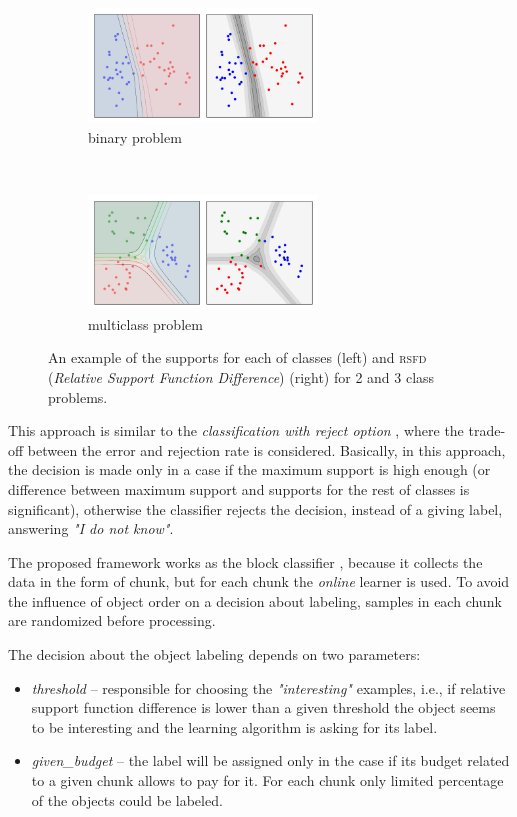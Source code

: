 \begin{figure}[!ht]
	\centering
	\begin{subfigure}[b]{0.5\textwidth}
        \centering
        \includegraphics[height=1.2in]{figures/2_classes}
        \caption{binary problem}
    \end{subfigure}%
    ~ 
    \begin{subfigure}[b]{0.5\textwidth}
        \centering
        \includegraphics[height=1.2in]{figures/3_classes}
        \caption{multiclass problem}
    \end{subfigure}
    
	\caption{An example of the supports for each of classes (left) and \textsc{rsfd} (\emph{Relative Support Function Difference}) (right) for 2 and 3 class problems.}
	\label{fig:gestosc}
\end{figure}

This approach is similar to the \emph{classification with reject option} \cite{Chow:1970,Fumera:2000}, where the trade-off between the error and rejection rate is considered. Basically, in this approach, the decision is made only in a case if the maximum support is high enough (or difference between maximum support and supports for the rest of classes is significant), otherwise the classifier rejects the decision, instead of a giving label, answering \emph{"I do not know"}.   

The proposed framework works as the block classifier \cite{Krawczyk:2017}, because it collects the data in the form of chunk, but for each chunk the \emph{online} learner is used. To avoid the influence of object order on a decision about labeling, samples in each chunk are randomized before processing.  

The decision about the object labeling depends on two parameters:

\begin{itemize}
\item \emph{threshold} -- responsible for choosing the \emph{"interesting"} examples, i.e., if relative support function difference is lower than a given threshold the object seems to be interesting and the learning algorithm is asking for its label.
\item \emph{given\_budget} -- the label will be assigned only in the case if its budget related to a given chunk allows to pay for it. For each chunk only limited percentage of the objects could be labeled.
\end{itemize}

